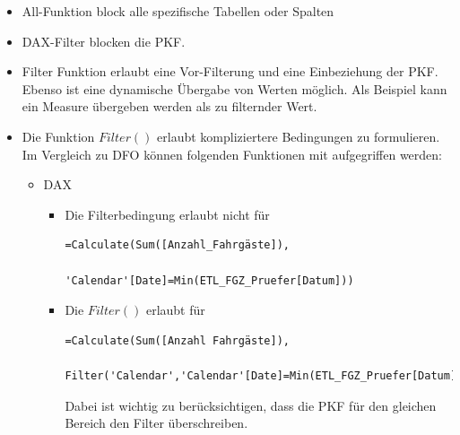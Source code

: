 \begin{itemize}
	\item All-Funktion block alle spezifische Tabellen oder Spalten
	\item \gls{DAX}-Filter blocken die \gls{PKF}. 
	\item Filter Funktion erlaubt eine Vor-Filterung und eine Einbeziehung der \gls{PKF}. Ebenso ist eine dynamische Übergabe von Werten möglich. Als Beispiel kann ein Measure übergeben werden als zu filternder Wert.
\end{itemize}


\begin{itemize}
	\item Die Funktion $Filter()$ erlaubt kompliziertere Bedingungen zu formulieren. Im Vergleich zu \gls{DFO} können folgenden Funktionen mit aufgegriffen werden:
	\begin{itemize}
		\item \gls{DAX}
		\begin{itemize}
			\item Die Filterbedingung erlaubt nicht für 
			\begin{lstlisting}[style=DAX]
				=Calculate(Sum([Anzahl_Fahrgäste]),
				'Calendar'[Date]=Min(ETL_FGZ_Pruefer[Datum]))
			\end{lstlisting}
			\item Die $Filter()$ erlaubt für
			\begin{lstlisting}[style=DAX]
				=Calculate(Sum([Anzahl Fahrgäste]),
				Filter('Calendar','Calendar'[Date]=Min(ETL_FGZ_Pruefer[Datum])))
			\end{lstlisting}
			Dabei ist wichtig zu berücksichtigen, dass die \gls{PKF} für den gleichen Bereich den Filter überschreiben.
			\begin{figure}[H]
				\centering

\end{figure}
\end{itemize}
\end{itemize}
\end{itemize}
